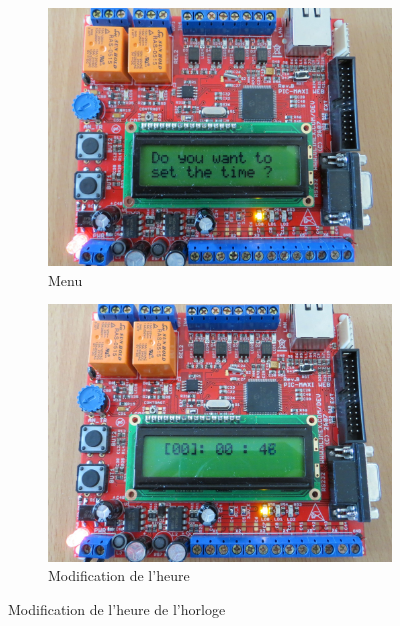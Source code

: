\documentclass[12pt,a4paper]{article}
\begin{document}
\begin{figure}[!h]
        \centering
        \begin{subfigure}[b]{0.48\textwidth}
                \includegraphics[width=\textwidth]{photos/IMG_2150.JPG}
                \caption{Menu}
                \label{fig:questionhorloge}
        \end{subfigure}
        \begin{subfigure}[b]{0.48\textwidth}
                \includegraphics[width=\textwidth]{photos/IMG_2153.JPG}
                \caption{Modification de l'heure}
                \label{fig:modificationhorloge}
        \end{subfigure}
        \caption{Modification de l'heure de l'horloge}\label{fig:horloge}
\end{figure}
\end{document}
